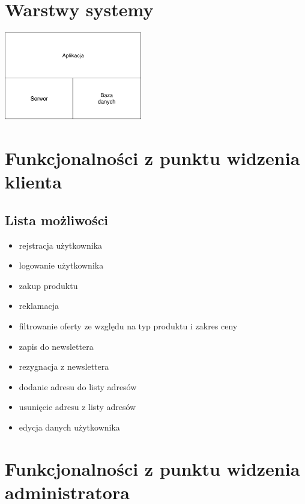 \documentclass[10pt]{report}
\begin{document}
		\section{Warstwy systemy}
			\begin{center}
				\includegraphics[width=170pt]{layers.pdf}
			\end{center}
		
		\section{Funkcjonalności z punktu widzenia klienta}

			\subsection{Lista możliwości}
				\begin{itemize}
					\item rejstracja użytkownika
					\item logowanie użytkownika
					\item zakup produktu
					\item reklamacja
					\item filtrowanie oferty ze względu na typ produktu i zakres ceny
					\item zapis do newslettera
					\item rezygnacja z newslettera
					\item dodanie adresu do listy adresów
					\item usunięcie adresu z listy adresów
					\item edycja danych użytkownika
			\end{itemize}

		\section{Funkcjonalności z punktu widzenia administratora}
\end{document}
